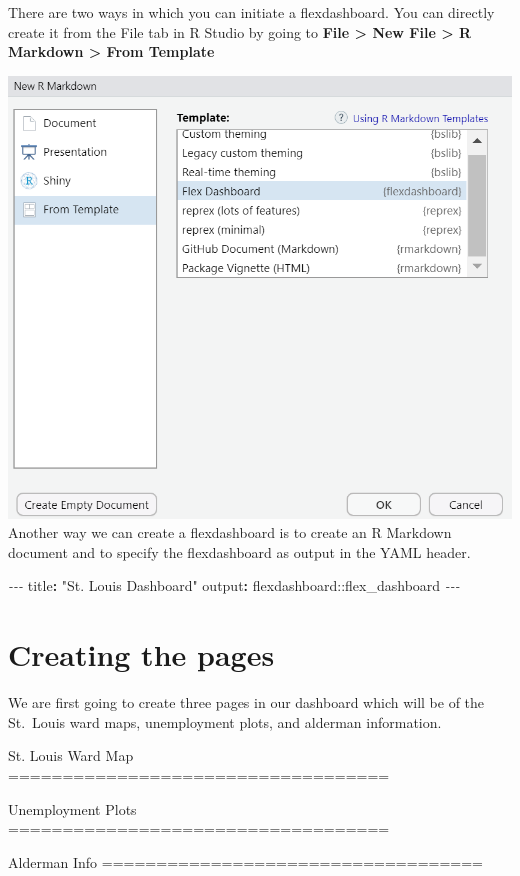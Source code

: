 \documentclass[
  krantz2]{krantz}
\makeatletter
\newenvironment{Shaded}{\begin{snugshade}}{\end{snugshade}}
\newcommand{\AttributeTok}[1]{\textcolor[rgb]{0.61,0.61,0.61}{#1}}
\newcommand{\FunctionTok}[1]{\textcolor[rgb]{0,0,0}{#1}}
\newcommand{\KeywordTok}[1]{\textcolor[rgb]{0.27,0.27,0.27}{\textbf{#1}}}
\newcommand{\NormalTok}[1]{#1}
\newcommand{\PreprocessorTok}[1]{\textcolor[rgb]{0.37,0.37,0.37}{\textit{#1}}}
\newcommand{\StringTok}[1]{\textcolor[rgb]{0.5,0.5,0.5}{#1}}
\newenvironment{kframe}{%
\medskip{}
\setlength{\fboxsep}{.8em}
 \def\at@end@of@kframe{}%
 \ifinner\ifhmode%
  \def\at@end@of@kframe{\end{minipage}}%
  \begin{minipage}{\columnwidth}%
 \fi\fi%
 \def\FrameCommand##1{\hskip\@totalleftmargin \hskip-\fboxsep
 \colorbox{shadecolor}{##1}\hskip-\fboxsep
     \hskip-\linewidth \hskip-\@totalleftmargin \hskip\columnwidth}%
 \MakeFramed {\advance\hsize-\width
   \@totalleftmargin\z@ \linewidth\hsize
   \@setminipage}}%
 {\par\unskip\endMakeFramed%
 \at@end@of@kframe}
\renewenvironment{Shaded}{\begin{kframe}}{\end{kframe}}
\makeatother
\begin{document}
There are two ways in which you can initiate a flexdashboard. You can directly create it from the File tab in R Studio by going to \textbf{File \textgreater{} New File \textgreater{} R Markdown \textgreater{} From Template}

\includegraphics{images/rstudio_flex.png}
Another way we can create a flexdashboard is to create an R Markdown document and to specify the flexdashboard as output in the YAML header.

\begin{Shaded}
\begin{Highlighting}[]
\PreprocessorTok{{-}{-}{-}}
\FunctionTok{title}\KeywordTok{:}\AttributeTok{ }\StringTok{"St. Louis Dashboard"}
\FunctionTok{output}\KeywordTok{:}\AttributeTok{ flexdashboard::flex\_dashboard}
\PreprocessorTok{{-}{-}{-}}
\end{Highlighting}
\end{Shaded}

\hypertarget{creating-the-pages}{%
\section{Creating the pages}\label{creating-the-pages}}

We are first going to create three pages in our dashboard which will be of the St.~Louis ward maps, unemployment plots, and alderman information.

\begin{Shaded}
\begin{Highlighting}[]
\NormalTok{St. Louis Ward Map}
\FunctionTok{===================================}


\NormalTok{Unemployment Plots}
\FunctionTok{===================================}

\NormalTok{Alderman Info}
\FunctionTok{===================================}
\end{Highlighting}
\end{Shaded}
\end{document}
